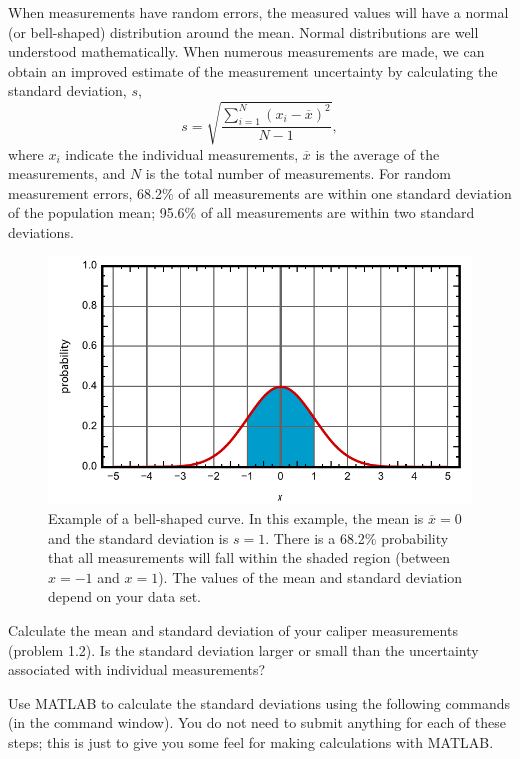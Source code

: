 \documentclass[11pt,letterpaper]{article}
\newcounter{question}[section]
\begin{document}
\question{} When measurements have random errors, the measured values will have a normal (or bell-shaped) distribution around the mean. Normal distributions are well understood mathematically. When numerous measurements are made, we can obtain an improved estimate of the measurement uncertainty by calculating the standard deviation, $s$,
\begin{equation*}
s=\sqrt{\frac{\displaystyle\sum_{i=1}^N(x_i-\overline{x})^2 }{N-1}},
\end{equation*}
where $x_i$ indicate the individual measurements, $\overline{x}$ is the average of the measurements, and $N$ is the total number of measurements. For random measurement errors, 68.2\% of all measurements are within one standard deviation of the population mean; 95.6\% of all measurements are within two standard deviations.
\begin{figure}[h!]
\begin{center}
\includegraphics[]{./bell_curve}
\end{center}
\caption*{Example of a bell-shaped curve. In this example, the mean is $\overline{x}=0$ and the standard deviation is $s=1$. There is a 68.2\% probability that all measurements will fall within the shaded region (between $x=-1$ and $x=1$). The values of the mean and standard deviation depend on your data set.}
\end{figure}

Calculate the mean and standard deviation of your caliper measurements (problem 1.2). Is the standard deviation larger or small than the uncertainty associated with individual measurements?

Use MATLAB to calculate the standard deviations using the following commands (in the command window). You do not need to submit anything for each of these steps; this is just to give you some feel for making calculations with MATLAB.
\end{document}

